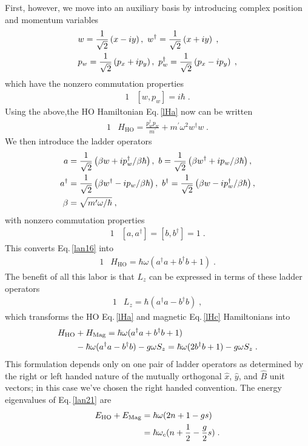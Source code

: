 \documentclass[epj]{svjour}
\begin{document}
First, however, we move into an auxiliary basis by introducing complex position and momentum variables
\begin{alignat}{1}
\label{lan14} &w=\frac{1}{\sqrt{2}}\left(x-iy\right),\ w^{\dagger}=\frac{1}{\sqrt{2}}\left(x+iy\right)\;,\\ &p_{w}=\frac{1}{\sqrt{2}}\left(p_{x}+ip_{y}\right),\ p_{w}^{\dagger}=\frac{1}{\sqrt{2}}\left(p_{x}-ip_{y}\right)\notag\;,
\end{alignat}
which have the nonzero commutation properties
\begin{alignat}{1}
\label{lan15} &[w,p_{w}]=i\hbar\;.
\end{alignat}
Using the above,the HO Hamiltonian Eq.\,\eqref{lHa} now can be written  
\begin{alignat}{1}
\label{lan16} &H_\mathrm{HO}=\frac{p_{w}^{\dagger}p_{w}}{m^\prime }+m^\prime \omega^{2}w^{\dagger}w\;.
\end{alignat}
We then introduce the ladder operators
\begin{alignat}{1}
\label{lan17} a&=\frac{1}{\sqrt{2}}\left(\beta w+ip_{w}^{\dagger}/\beta \hbar\right),\ b=\frac{1}{\sqrt{2}}\left(\beta w^{\dagger}+ip_{w}/\beta \hbar\right),\\ \notag a^{\dagger}&=\frac{1}{\sqrt{2}}\left(\beta w^{\dagger}-ip_{w}/\beta \hbar\right),\ b^{\dagger}=\frac{1}{\sqrt{2}}\left(\beta w-ip_{w}^{\dagger}/\beta \hbar\right),\\ \notag \beta&=\sqrt{m^\prime \omega/\hbar}\;,\end{alignat}
with nonzero commutation properties
\begin{alignat}{1}
\label{lan18} &[a,a^{\dagger}]=[b,b^{\dagger}]=1\;.
\end{alignat}
This converts Eq.\,\eqref{lan16} into
\begin{alignat}{1}
\label{lan19} &H_\mathrm{HO}=\hbar\omega(a^{\dagger}a+b^{\dagger}b+1)\;.
\end{alignat}
The benefit of all this labor is that $L_{z}$ can be expressed in terms of these ladder operators
\begin{alignat}{1}
\label{lan20} &L_{z}=\hbar(a^{\dagger}a-b^{\dagger}b)\;,\end{alignat}
which transforms the HO Eq.\,\eqref{lHa} and magnetic Eq.\,\eqref{lHc} Hamiltonians into 
\begin{alignat}{1}
\label{lan21} H_\mathrm{HO}&+H_\mathrm{Mag}=\hbar\omega(a^{\dagger}a+b^{\dagger}b+1)\\ \notag &-\hbar\omega(a^{\dagger}a-b^{\dagger}b)-g\omega S_{z} =\hbar\omega(2b^{\dagger}b+1)-g\omega S_{z}\;.
\end{alignat}
This formulation depends only on one pair of ladder operators as determined by the right or left handed nature of the mutually orthogonal $\hat{x}$, $\hat{y}$, and $\hat{B}$ unit vectors; in this case we've chosen the right handed convention. The energy eigenvalues of Eq.\,\eqref{lan21} are
\begin{alignat}{1}
\label{lan22} E_\mathrm{HO}+E_\mathrm{Mag}&=\hbar\omega(2n+1-gs)\\ \notag &=\hbar\omega_{c}(n+\frac{1}{2}-\frac{g}{2}s)\;.
\end{alignat}
\end{document}
